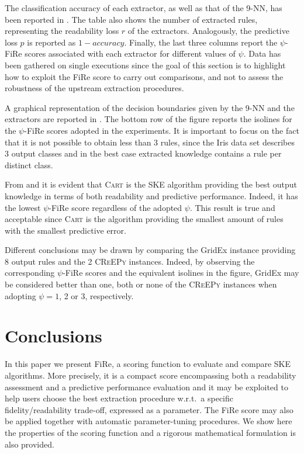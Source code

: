 \documentclass{article}
\newcommand{\gridex}{GridEx}
\newcommand{\creepy}{\textsc{CReEPy}}
\newcommand{\cart}{\textsc{Cart}}
\newcommand{\fire}{FiRe}
\newcommand{\psifire}{$\psi$-\fire}
\begin{document}
The classification accuracy of each extractor, as well as that of the 9-NN, has been reported in .
%
The table also shows the number of extracted rules, representing the readability loss $r$ of the extractors.
%
Analogously, the predictive loss $p$ is reported as $1-accuracy$.
%
Finally, the last three columns report the \psifire{} scores associated with each extractor for different values of $\psi$.
%
Data has been gathered on single executions since the goal of this section is to highlight how to exploit the \fire{} score to carry out comparisons, and not to assess the robustness of the upstream extraction procedures.

A graphical representation of the decision boundaries given by the 9-NN and the extractors are reported in .
%
The bottom row of the figure reports the isolines for the \psifire{} scores adopted in the experiments.
%
It is important to focus on the fact that it is not possible to obtain less than 3 rules, since the Iris data set describes 3 output classes and in the best case extracted knowledge contains a rule per distinct class.

From  and  it is evident that \cart{} is the SKE algorithm providing the best output knowledge in terms of both readability and predictive performance.
%
Indeed, it has the lowest \psifire{} score regardless of the adopted $\psi$.
%
This result is true and acceptable since \cart{} is the algorithm providing the smallest amount of rules with the smallest predictive error.

Different conclusions may be drawn by comparing the \gridex{} instance providing 8 output rules and the 2 \creepy{} instances.
%
Indeed, by observing the corresponding \psifire{} scores and the equivalent isolines in the figure, \gridex{} may be considered better than one, both or none of the \creepy{} instances when adopting $\psi=1$, 2 or 3, respectively.

\section{Conclusions}\label{sec:conclusions}

In this paper we present \fire{}, a scoring function to evaluate and compare SKE algorithms.
%
More precisely, it is a compact score encompassing both a readability assessment and a predictive performance evaluation and it may be exploited to help users choose the best extraction procedure w.r.t.\ a specific fidelity/readability trade-off, expressed as a parameter.
%
The \fire{} score may also be applied together with automatic parameter-tuning procedures.
%
We show here the properties of the scoring function and a rigorous mathematical formulation is also provided.
\end{document}
